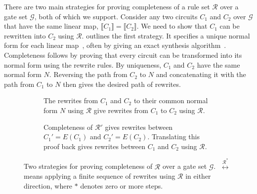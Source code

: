 \documentclass[acmsmall,nonacm,11pt,screen]{acmart}
\newcommand{\tikzfig}[1]{{\tikzstyle{every picture}=[tikzfig]}}
\newcommand{\rewrites}[1]{\overset{#1^{*}}{\longleftrightarrow}}
\begin{document}
There are two main strategies for proving completeness of a rule set $\mathcal{R}$ over a gate set $\mathcal{G}$, both of which we support. Consider any two circuits $C_1$ and $C_2$ over $\mathcal{G}$ that have the same linear map, $\llbracket C_1\rrbracket = \llbracket C_2 \rrbracket$. We need to show that $C_1$ can be rewritten into $C_2$ using $\mathcal{R}$.  outlines the first strategy. It specifies a unique normal form for each linear map~\cite{lafont2003boolean,sakashita2013cnot,feng2026complete,feng2026ancillas,selinger2015clifford,bian2026qupit,makary2021real,amy2018cnotdihedral,blake2026phaseaffine,li2025qutrit}, often by giving an exact synthesis algorithm~\cite{greylyn2014,bian2021un,li2021on,fang2026hadamard,clement2019thesis}. Completeness follows by proving that every circuit can be transformed into its normal form using the rewrite rules. By uniqueness, $C_1$ and $C_2$ have the same normal form $N$. Reversing the path from $C_2$ to $N$ and concatenating it with the path from $C_1$ to $N$ then gives the desired path of rewrites.


\begin{figure}[!thb]
\centering
\begin{subfigure}[b]{0.42\linewidth}
  \centering
  \scalebox{.8}{\tikzfig{figures/normalform}}
  \caption{The rewrites from $C_1$ and $C_2$ to their common normal form $N$ using $\mathcal{R}$ give rewrites from $C_1$ to $C_2$ using $\mathcal{R}$.}
  \label{fig:normalform}
\end{subfigure}\hfill
\begin{subfigure}[b]{0.52\linewidth}
  \centering
  \scalebox{.8}{\tikzfig{figures/translation}}
  \caption{Completeness of $\mathcal{R}'$ gives rewrites between $C_1'=E(C_1)$ and $C_2'=E(C_2)$. Translating this proof back gives rewrites between $C_1$ and $C_2$ using $\mathcal{R}$.}
  \label{fig:translation}
\end{subfigure}
\vspace{-.2 cm}
\caption{Two strategies for proving completeness of $\mathcal{R}$ over a gate set $\mathcal{G}$. $\;\rewrites{\mathcal{R}}\;$ means applying a finite sequence of rewrites using $\mathcal{R}$ in either direction, where $*$ denotes zero or more steps.}
\label{fig:strategies}
\end{figure}
\end{document}
